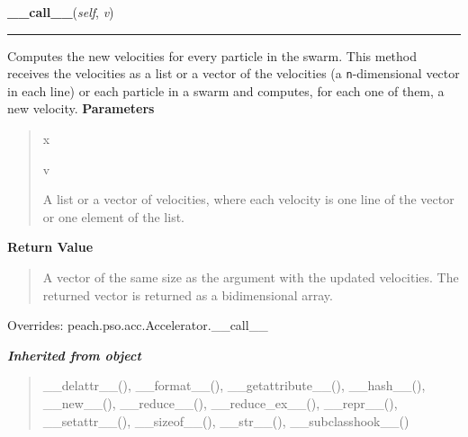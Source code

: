     \vspace{0.5ex}

\hspace{.8\funcindent}\begin{boxedminipage}{\funcwidth}

    \raggedright \textbf{\_\_call\_\_}(\textit{self}, \textit{v})

    \vspace{-1.5ex}

    \rule{\textwidth}{0.5\fboxrule}
\setlength{\parskip}{2ex}

Computes the new velocities for every particle in the swarm. This method
receives the velocities as a list or a vector of the velocities (a
\texttt{n}-dimensional vector in each line) or each particle in a swarm and
computes, for each one of them, a new velocity.
\setlength{\parskip}{1ex}
      \textbf{Parameters}
      \vspace{-1ex}

      \begin{quote}
        \begin{Ventry}{x}

          \item[v]


A list or a vector of velocities, where each velocity is one line of
the vector or one element of the list.
        \end{Ventry}

      \end{quote}

      \textbf{Return Value}
    \vspace{-1ex}

      \begin{quote}

A vector of the same size as the argument with the updated velocities.
The returned vector is returned as a bidimensional array.
      \end{quote}

      Overrides: peach.pso.acc.Accelerator.\_\_call\_\_

    \end{boxedminipage}


\large{\textbf{\textit{Inherited from object}}}

\begin{quote}
\_\_delattr\_\_(), \_\_format\_\_(), \_\_getattribute\_\_(), \_\_hash\_\_(), \_\_new\_\_(), \_\_reduce\_\_(), \_\_reduce\_ex\_\_(), \_\_repr\_\_(), \_\_setattr\_\_(), \_\_sizeof\_\_(), \_\_str\_\_(), \_\_subclasshook\_\_()
\end{quote}

